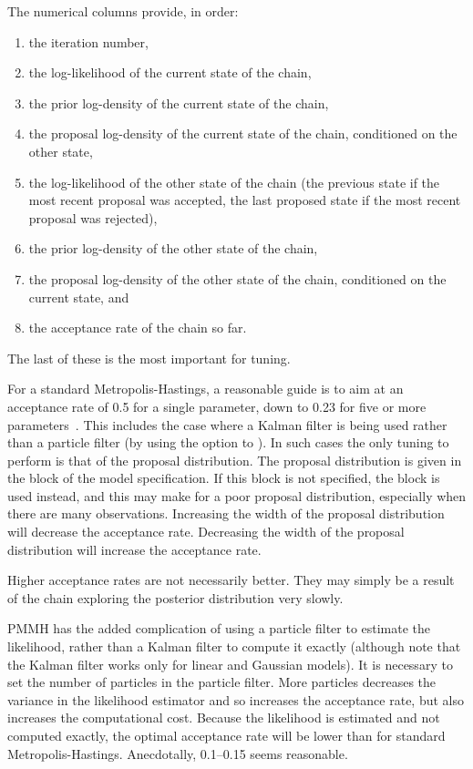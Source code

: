 The numerical columns provide, in order:
\begin{enumerate}
\item the iteration number,
\item the log-likelihood of the current state of the chain,
\item the prior log-density of the current state of the chain,
\item the proposal log-density of the current state of the chain, conditioned
  on the other state,
\item the log-likelihood of the other state of the chain (the previous state
  if the most recent proposal was accepted, the last proposed state if the
  most recent proposal was rejected),
\item the prior log-density of the other state of the chain,
\item the proposal log-density of the other state of the chain, conditioned on
  the current state, and
\item the acceptance rate of the chain so far.
\end{enumerate}
The last of these is the most important for tuning.

For a standard Metropolis-Hastings, a reasonable guide is to aim at an
acceptance rate of 0.5 for a single parameter, down to 0.23 for five or more
parameters~\citep{Gelman1994}. This includes the case where a Kalman filter is
being used rather than a particle filter (by using the 
option to ). In such cases the only tuning to perform is
that of the proposal distribution. The proposal distribution is given in the
 block of the model specification. If this block
is not specified, the  block is used instead, and this may
make for a poor proposal distribution, especially when there are many
observations. Increasing the width of the proposal distribution will decrease
the acceptance rate. Decreasing the width of the proposal distribution will
increase the acceptance rate.

\begin{tip}
Higher acceptance rates are not necessarily better. They may simply be a
result of the chain exploring the posterior distribution very slowly.
\end{tip}

PMMH has the added complication of using a particle filter to estimate the
likelihood, rather than a Kalman filter to compute it exactly (although note
that the Kalman filter works only for linear and Gaussian models). It is
necessary to set the number of particles in the particle filter. More
particles decreases the variance in the likelihood estimator and so increases
the acceptance rate, but also increases the computational cost. Because the
likelihood is estimated and not computed exactly, the optimal acceptance rate
will be lower than for standard Metropolis-Hastings. Anecdotally, 0.1--0.15
seems reasonable.

